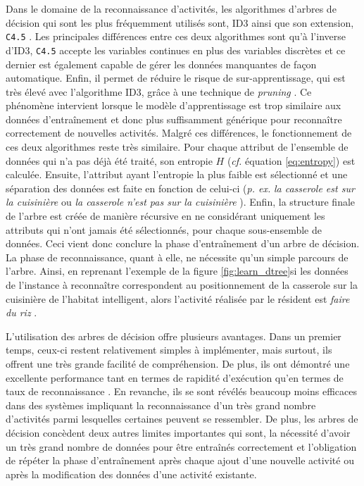Dans le domaine de la reconnaissance d'activités, les algorithmes d'arbres de décision qui sont les plus fréquemment utilisés sont, \ac{ID3} ainsi que son extension, \texttt{C4.5} \citep{QuinlanRoss1993}. Les principales différences entre ces deux algorithmes sont qu'à l'inverse d'\acs{ID3}, \texttt{C4.5} accepte les variables continues en plus des variables discrètes et ce dernier est également capable de gérer les données manquantes de façon automatique. Enfin, il permet de réduire le risque de sur-apprentissage, qui est très élevé avec l'algorithme \acs{ID3}, grâce à une technique de \textit{pruning} \citep{Bao2004, Ravi2005, Tapia2007}. Ce phénomène intervient lorsque le modèle d'apprentissage est trop similaire aux données d'entraînement et donc plus suffisamment générique pour reconnaître correctement de nouvelles activités. Malgré ces différences, le fonctionnement de ces deux algorithmes reste très similaire. Pour chaque attribut de l'ensemble de données qui n'a pas déjà été traité, son entropie $H$ (\textit{cf. } équation \ref{eq:entropy}) est calculée. Ensuite, l'attribut ayant l'entropie la plus faible est sélectionné et une séparation des données est faite en fonction de celui-ci (\textit{p. ex.} \og \textit{la casserole est sur la cuisinière} \fg ou \og \textit{la casserole n'est pas sur la cuisinière} \fg). Enfin, la structure finale de l'arbre est créée de manière récursive en ne considérant uniquement les attributs qui n'ont jamais été sélectionnés, pour chaque sous-ensemble de données. Ceci vient donc conclure la phase d'entraînement d'un arbre de décision. La phase de reconnaissance, quant à elle, ne nécessite qu'un simple parcours de l'arbre. Ainsi, en reprenant l'exemple de la figure \ref{fig:learn_dtree}\textemdash si les données de l'instance à reconnaître correspondent au positionnement de la casserole sur la cuisinière de l'habitat intelligent, alors l'activité réalisée par le résident est \og \textit{faire du riz} \fg.

L'utilisation des arbres de décision offre plusieurs avantages. Dans un premier temps, ceux-ci restent relativement simples à implémenter, mais surtout, ils offrent une très grande facilité de compréhension. De plus, ils ont démontré une excellente performance tant en termes de rapidité d'exécution qu'en termes de taux de reconnaissance \citep{Bao2004}. En revanche, ils se sont révélés beaucoup moins efficaces dans des systèmes impliquant la reconnaissance d'un très grand nombre d'activités parmi lesquelles certaines peuvent se ressembler. De plus, les arbres de décision concèdent deux autres limites importantes qui sont, la nécessité d'avoir un très grand nombre de données pour être entraînés correctement et l'obligation de répéter la phase d'entraînement après chaque ajout d'une nouvelle activité ou après la modification des données d'une activité existante.

